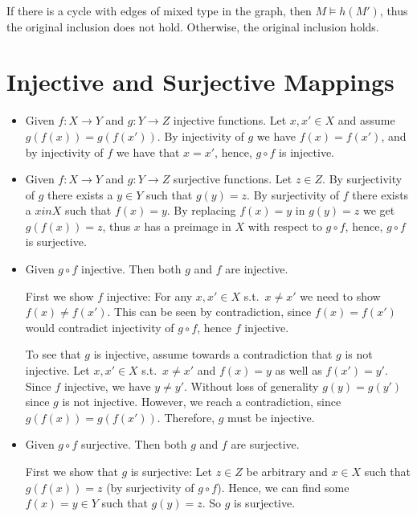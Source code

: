 \documentclass[a4paper,12pt]{article}
\begin{document}
If there is a cycle with edges of mixed type in the graph, then $M \models h(M')$, thus the original inclusion does not hold. Otherwise, the original inclusion holds.


\section{Injective and Surjective Mappings}

\begin{itemize}
\item{Given $f : X \rightarrow Y$ and $g : Y \rightarrow Z$ injective functions.
Let $x, x' \in X$ and assume $g(f(x)) = g(f(x'))$. By injectivity of $g$ we have $f(x) = f(x')$, and by injectivity of $f$ we have that $x = x'$, hence, $g \circ f$ is injective.
}
\item{Given $f : X \rightarrow Y$ and $g : Y \rightarrow Z$ surjective functions.
Let $z \in Z$. By surjectivity of $g$ there exists a $y \in Y$ such that $g(y) = z$. By surjectivity of $f$ there exists a $x in X$ such that $f(x) = y$. By replacing $f(x) = y$ in $g(y) = z$ we get $g(f(x)) = z$, thus $x$ has a preimage in $X$ with respect to $g \circ f$, hence, $g \circ f$ is surjective.
}
\item{
Given $g \circ f$ injective. Then both $g$ and $f$ are injective.

First we show $f$ injective: For any $x, x' \in X$ s.t.\ $x \neq x'$ we need to show $f(x) \neq f(x')$. This can be seen by contradiction, since $f(x) = f(x')$ would contradict injectivity of  $g \circ f$, hence $f$ injective.

To see that $g$ is injective, assume towards a contradiction that $g$ is not injective.  Let $x, x' \in X$ s.t.\ $x \neq x'$ and $f(x) = y$ as well as $f(x') = y'$. Since $f$ injective, we have $y \neq y'$. Without loss of generality $g(y) = g(y')$ since $g$ is not injective. However, we reach a contradiction, since $g(f(x)) = g(f(x'))$. Therefore, $g$ must be injective.
}
\item{
Given $g \circ f$ surjective. Then both $g$ and $f$ are surjective.

First we show that $g$ is surjective: Let $z \in Z$ be arbitrary and $x \in X$ such that $g(f(x)) = z$ (by surjectivity of $g \circ f$). Hence, we can find some $f(x) = y \in Y$ such that $g(y) = z$. So $g$ is surjective.

}
\end{itemize}
\end{document}
